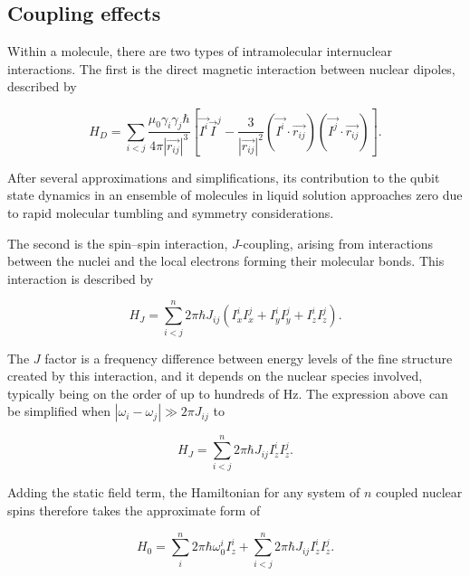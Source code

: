 \subsection{Coupling effects}
\label{subsec:coupling_effects}

Within a molecule, there are two types of intramolecular internuclear interactions. The first is the direct magnetic interaction between nuclear dipoles, described by

\begin{equation}
    H_D=\sum_{i<j}{\frac{\mu_0\gamma_i\gamma_j\hbar}{4\pi|\vec{r_{ij}}|^3}\left[\vec{I^i}\vec{I}^j-\frac{3}{|\vec{r_{ij}}|^2}(\vec{I^i}\cdot\vec{r_{ij}})(\vec{I^j}\cdot\vec{r_{ij}})\right]}.
    \label{eq:dipolar_coupling}
\end{equation}

After several approximations and simplifications, its contribution to the qubit state dynamics in an ensemble of molecules in liquid solution approaches zero due to rapid molecular tumbling and symmetry considerations.

The second is the spin–spin interaction, \(J\)-coupling, arising from interactions between the nuclei and the local electrons forming their molecular bonds. This interaction is described by

\begin{equation}
    H_J=\sum_{i<j}^n{2\pi \hbar J_{ij}(I_x^i I_x^j+I_y^i I_y^j+I_z^i I_z^j)}.
    \label{eq:J-coupling}
\end{equation}

The \(J\) factor is a frequency difference between energy levels of the fine structure created by this interaction, and it depends on the nuclear species involved, typically being on the order of up to hundreds of Hz. The expression above can be simplified when \(|\omega_i-\omega_j| \gg 2\pi J_{ij}\) to

\begin{equation}
    H_J=\sum_{i<j}^n{2\pi \hbar J_{ij}I_z^i I_z^j}.
    \label{eq:J-coupling_simplified}
\end{equation}

Adding the static field term, the Hamiltonian for any system of \(n\) coupled nuclear spins therefore takes the approximate form of

\begin{equation}
    H_0=\sum_{i}^n{2\pi\hbar\omega_{0}^{i}I_z^i}+\sum_{i<j}^n{2\pi \hbar J_{ij}I_z^i I_z^j}.
    \label{eq:H_0}
\end{equation}

